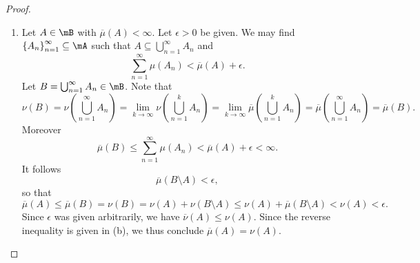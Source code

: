 \documentclass[pmath451]{subfiles}
\begin{document}
\begin{proof}
\begin{enumerate}
            \item Let $A\in\mB$ with $\overline{\mu}\left( A \right) < \infty$. Let $\epsilon>0$ be given. We may find $\left\lbrace A_n \right\rbrace^{\infty}_{n=1}\subseteq\mA$ such that $A\subseteq\bigcup^{\infty}_{n=1} A_n$ and
                \begin{equation*}
                    \sum^{\infty}_{n=1} \mu\left( A_n \right) < \overline{\mu}\left( A \right) + \epsilon.
                \end{equation*}
                Let $B = \bigcup^{\infty}_{n=1} A_n\in\mB$. Note that
                \begin{equation*}
                    \nu\left( B \right) = \nu\left( \bigcup^{\infty}_{n=1} A_n \right) = \lim_{k\to\infty} \nu\left( \bigcup^{k}_{n=1}A_n \right) = \lim_{k\to\infty} \overline{\mu}\left( \bigcup^{k}_{n=1} A_n \right) = \overline{\mu}\left( \bigcup^{\infty}_{n=1} A_n \right) = \overline{\mu}\left( B \right).
                \end{equation*}
                Moreover
                \begin{equation*}
                    \overline{\mu}\left( B \right) \leq \sum^{\infty}_{n=1} \mu\left( A_n \right) < \overline{\mu}\left( A \right) + \epsilon < \infty.
                \end{equation*}
                It follows
                \begin{equation*}
                    \overline{\mu}\left( B\setminus A \right) < \epsilon,
                \end{equation*}
                so that
                \begin{equation*}
                    \overline{\mu}\left( A \right) \leq \overline{\mu}\left( B \right) = \nu\left( B \right) = \nu\left( A \right) + \nu\left( B\setminus A \right) \leq \nu\left( A \right) + \overline{\mu}\left( B\setminus A \right) < \nu\left( A \right) < \epsilon.
                \end{equation*}
                Since $\epsilon$ was given arbitrarily, we have $\overline{\nu}\left( A \right)\leq\nu\left( A \right)$. Since the reverse inequality is given in (b), we thus conclude $\overline{\mu}\left( A \right) = \nu\left( A \right)$.


\end{enumerate}
\end{proof}
\end{document}

